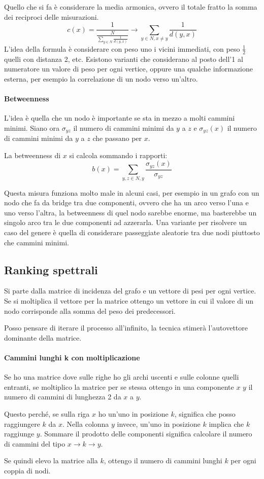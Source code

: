 Quello che si fa è considerare la media armonica, ovvero il totale fratto la 
somma dei reciproci delle misurazioni.
$$c(x) = \frac{1}{\frac{N}{\sum_{y \in N} \frac{1}{d(y, x)}}} \rightarrow \sum_{y \in N, x \neq y} \frac{1}{d(y, x)}$$
L'idea della formula è considerare con peso uno i vicini immediati, con peso 
$\frac{1}{2}$ quelli con distanza 2, etc.
Esistono varianti che considerano al posto dell'1 al numeratore un valore di 
peso per ogni vertice, oppure una qualche informazione esterna, per esempio 
la correlazione di un nodo verso un'altro.

\paragraph{Betweenness}
L'idea è quella che un nodo è importante se sta in mezzo a molti cammini minimi.
Siano ora $\sigma_{yz}$ il numero di cammini minimi da $y$ a $z$ e $\sigma_{yz}(x)$ 
il numero di cammini minimi da $y$ a $z$ che passano per $x$.

La betweenness di $x$ si calcola sommando i rapporti: 
$$b(x) = \sum_{y, z \in N, y } \frac{\sigma_{yz}(x)}{\sigma_{yz}}$$

Questa misura funziona molto male in alcuni casi, per esempio in un grafo con un nodo 
che fa da bridge tra due componenti, ovvero che ha un arco verso l'una e uno verso 
l'altra, la betweenness di quel nodo sarebbe enorme, ma basterebbe un singolo arco 
tra le due componenti ad azzerarla. 
Una variante per risolvere un caso del genere è quella di considerare passeggiate 
aleatorie tra due nodi piuttosto che cammini minimi.

\subsection{Ranking spettrali}

Si parte dalla matrice di incidenza del grafo e un vettore di pesi per ogni vertice. 
Se si moltiplica il vettore per la matrice ottengo un vettore in cui il valore 
di un nodo corrisponde alla somma del peso dei predecessori.

Posso pensare di iterare il processo all'infinito, la tecnica stimerà l'autovettore 
dominante della matrice.

\paragraph{Cammini lunghi k con moltiplicazione}
Se ho una matrice dove sulle righe ho gli archi uscenti e sulle colonne quelli entranti, 
se moltiplico la matrice per se stessa ottengo in una componente $x$ $y$
il numero di cammini di lunghezza 2 da $x$ a $y$. 

Questo perché, se sulla riga $x$ ho un'uno in posizione $k$, significa che posso raggiungere $k$ da $x$. Nella colonna 
$y$ invece, un'uno in posizione $k$ implica che $k$ raggiunge $y$.
Sommare il prodotto delle componenti significa calcolare il numero di cammini del tipo 
$x \rightarrow k \rightarrow y$.

Se quindi elevo la matrice alla $k$, ottengo il numero di cammini lunghi $k$ per ogni 
coppia di nodi.